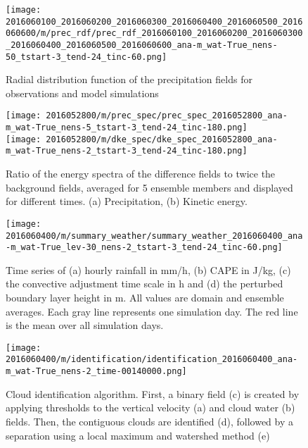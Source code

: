 \documentclass[a4paper, 12pt]{article}
\begin{document}
\begin{figure}[h!]
\noindent \centering
\texttt{[image: 2016060100\_2016060200\_2016060300\_2016060400\_2016060500\_2016060600/m/prec\_rdf/prec\_rdf\_2016060100\_2016060200\_2016060300\_2016060400\_2016060500\_2016060600\_ana-m\_wat-True\_nens-50\_tstart-3\_tend-24\_tinc-60.png]}\\
\caption{Radial distribution function of the precipitation fields for observations and model simulations} \label{fig:prec_rdf}
\end{figure}

\begin{figure}[h!]
\noindent \centering
\texttt{[image: 2016052800/m/prec\_spec/prec\_spec\_2016052800\_ana-m\_wat-True\_nens-5\_tstart-3\_tend-24\_tinc-180.png]}\\
\texttt{[image: 2016052800/m/dke\_spec/dke\_spec\_2016052800\_ana-m\_wat-True\_nens-2\_tstart-3\_tend-24\_tinc-180.png]}\\
\caption{Ratio of the energy spectra of the difference fields to twice the background fields, averaged for 5 ensemble members and displayed for different times. (a) Precipitation, (b) Kinetic energy.} \label{fig:spectra}
\end{figure}

\begin{figure}[h!]
\noindent \centering
\texttt{[image: 2016060400/m/summary\_weather/summary\_weather\_2016060400\_ana-m\_wat-True\_lev-30\_nens-2\_tstart-3\_tend-24\_tinc-60.png]}\\
\caption{Time series of (a) hourly rainfall in mm/h, (b) CAPE in J/kg, (c) the convective adjustment time scale in h and (d) the perturbed boundary layer height in m. All values are domain and ensemble averages. Each gray line represents one simulation day. The red line is the mean over all simulation days.} \label{fig:Fig3}
\end{figure}

\begin{figure}[ht]
\noindent \centering
\texttt{[image: 2016060400/m/identification/identification\_2016060400\_ana-m\_wat-True\_nens-2\_time-00140000.png]}\\
\caption{Cloud identification algorithm. First, a binary field (c) is created by applying thresholds to the vertical velocity (a) and cloud water (b) fields. Then, the contiguous clouds are identified (d), followed by a separation using a local maximum and watershed method (e)} \label{fig:Fig4}
\end{figure}
\end{document}
